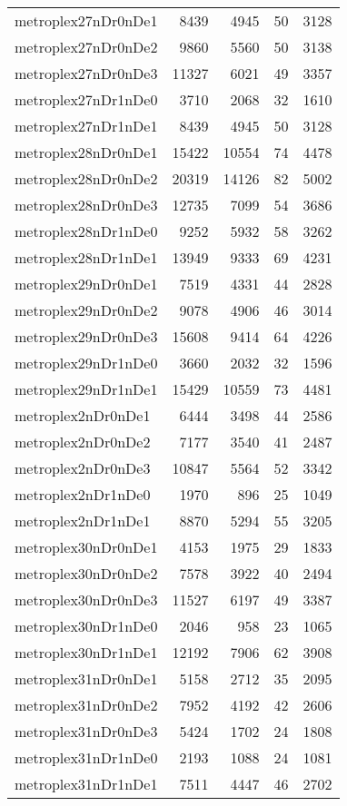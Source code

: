 \begin{longtable}{lrrrr}
metroplex27nDr0nDe1 & 8439 & 4945 & 50 & 3128 \\
metroplex27nDr0nDe2 & 9860 & 5560 & 50 & 3138 \\
metroplex27nDr0nDe3 & 11327 & 6021 & 49 & 3357 \\
metroplex27nDr1nDe0 & 3710 & 2068 & 32 & 1610 \\
metroplex27nDr1nDe1 & 8439 & 4945 & 50 & 3128 \\
metroplex28nDr0nDe1 & 15422 & 10554 & 74 & 4478 \\
metroplex28nDr0nDe2 & 20319 & 14126 & 82 & 5002 \\
metroplex28nDr0nDe3 & 12735 & 7099 & 54 & 3686 \\
metroplex28nDr1nDe0 & 9252 & 5932 & 58 & 3262 \\
metroplex28nDr1nDe1 & 13949 & 9333 & 69 & 4231 \\
metroplex29nDr0nDe1 & 7519 & 4331 & 44 & 2828 \\
metroplex29nDr0nDe2 & 9078 & 4906 & 46 & 3014 \\
metroplex29nDr0nDe3 & 15608 & 9414 & 64 & 4226 \\
metroplex29nDr1nDe0 & 3660 & 2032 & 32 & 1596 \\
metroplex29nDr1nDe1 & 15429 & 10559 & 73 & 4481 \\
metroplex2nDr0nDe1 & 6444 & 3498 & 44 & 2586 \\
metroplex2nDr0nDe2 & 7177 & 3540 & 41 & 2487 \\
metroplex2nDr0nDe3 & 10847 & 5564 & 52 & 3342 \\
metroplex2nDr1nDe0 & 1970 & 896 & 25 & 1049 \\
metroplex2nDr1nDe1 & 8870 & 5294 & 55 & 3205 \\
metroplex30nDr0nDe1 & 4153 & 1975 & 29 & 1833 \\
metroplex30nDr0nDe2 & 7578 & 3922 & 40 & 2494 \\
metroplex30nDr0nDe3 & 11527 & 6197 & 49 & 3387 \\
metroplex30nDr1nDe0 & 2046 & 958 & 23 & 1065 \\
metroplex30nDr1nDe1 & 12192 & 7906 & 62 & 3908 \\
metroplex31nDr0nDe1 & 5158 & 2712 & 35 & 2095 \\
metroplex31nDr0nDe2 & 7952 & 4192 & 42 & 2606 \\
metroplex31nDr0nDe3 & 5424 & 1702 & 24 & 1808 \\
metroplex31nDr1nDe0 & 2193 & 1088 & 24 & 1081 \\
metroplex31nDr1nDe1 & 7511 & 4447 & 46 & 2702 \\

\end{longtable}
